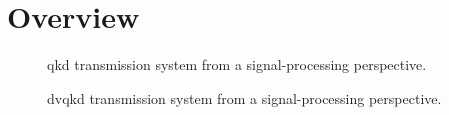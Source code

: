 \section{Overview}



\begin{figure}[htb]
	\centering
	
	\caption{\Gls{qkd} transmission system from a signal-processing perspective.}
\end{figure}

\begin{figure}[htb]
	\centering
	
	\caption{\Gls{dvqkd} transmission system from a signal-processing perspective.}
\end{figure}

\cite{Silberhorn2002} %
\cite{Fung2010} %